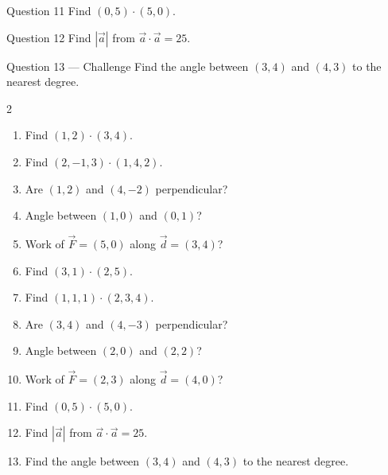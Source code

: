 \documentclass[11pt]{article}
\begin{document}
\begin{qbox}{Question 11}
Find $(0,5)\cdot(5,0)$.\workspace{2.4cm}
\end{qbox}

\begin{qbox}{Question 12}
Find $|\vec a|$ from $\vec a\cdot\vec a=25$.\workspace{2.4cm}
\end{qbox}

\begin{qbox}{Question 13 --- Challenge}
Find the angle between $(3,4)$ and $(4,3)$ to the nearest degree.\workspace{3cm}
\end{qbox}

\clearpage
{}

\begin{recapbox}
\begin{multicols}{2}
\small
\begin{enumerate}[leftmargin=*,itemsep=3pt]
  \item Find $(1,2)\cdot(3,4)$.
  \item Find $(2,-1,3)\cdot(1,4,2)$.
  \item Are $(1,2)$ and $(4,-2)$ perpendicular?
  \item Angle between $(1,0)$ and $(0,1)$?
  \item Work of $\vec F=(5,0)$ along $\vec d=(3,4)$?
  \item Find $(3,1)\cdot(2,5)$.
  \item Find $(1,1,1)\cdot(2,3,4)$.
  \item Are $(3,4)$ and $(4,-3)$ perpendicular?
  \item Angle between $(2,0)$ and $(2,2)$?
  \item Work of $\vec F=(2,3)$ along $\vec d=(4,0)$?
  \item Find $(0,5)\cdot(5,0)$.
  \item Find $|\vec a|$ from $\vec a\cdot\vec a=25$.
  \item Find the angle between $(3,4)$ and $(4,3)$ to the nearest degree.
\end{enumerate}
\end{multicols}
\end{recapbox}
\end{document}
